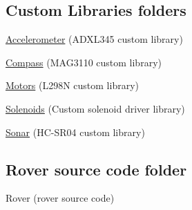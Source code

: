 \subsection*{Custom Libraries folders}


\begin{DoxyItemize}
\item \hyperlink{class_accelerometer}{Accelerometer} (A\+D\+X\+L345 custom library)
\item \hyperlink{class_compass}{Compass} (M\+A\+G3110 custom library)
\item \hyperlink{class_motors}{Motors} (L298\+N custom library)
\item \hyperlink{class_solenoids}{Solenoids} (Custom solenoid driver library)
\item \hyperlink{class_sonar}{Sonar} (H\+C-\/\+S\+R04 custom library)
\end{DoxyItemize}

\subsection*{Rover source code folder}


\begin{DoxyItemize}
\item Rover (rover source code) 
\end{DoxyItemize}